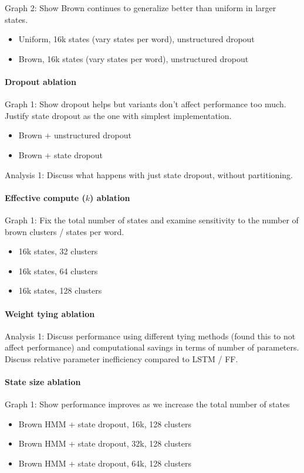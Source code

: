 \documentclass[11pt,a4paper]{article}
\begin{document}
Graph 2: Show Brown continues to generalize better than uniform in larger states.
\begin{itemize}
\item Uniform, 16k states (vary states per word), unstructured dropout
\item Brown, 16k states (vary states per word), unstructured dropout
\end{itemize}

\paragraph{Dropout ablation}
Graph 1: Show dropout helps but variants don't affect performance too much.
Justify state dropout as the one with simplest implementation.
\begin{itemize}
\item Brown + unstructured dropout
\item Brown + state dropout
\end{itemize}

Analysis 1: Discuss what happens with just state dropout, without partitioning.

\paragraph{Effective compute ($k$) ablation}
Graph 1: Fix the total number of states and examine sensitivity
to the number of brown clusters / states per word.
\begin{itemize}
\item 16k states, 32 clusters
\item 16k states, 64 clusters
\item 16k states, 128 clusters
\end{itemize}

\paragraph{Weight tying ablation}
Analysis 1: Discuss performance using different tying methods
(found this to not affect performance) and computational savings
in terms of number of parameters.
Discuss relative parameter inefficiency compared to LSTM / FF.

\paragraph{State size ablation}
Graph 1: Show performance improves as we increase the total number of states
\begin{itemize}
\item Brown HMM + state dropout, 16k, 128 clusters
\item Brown HMM + state dropout, 32k, 128 clusters
\item Brown HMM + state dropout, 64k, 128 clusters
\end{itemize}
\end{document}
